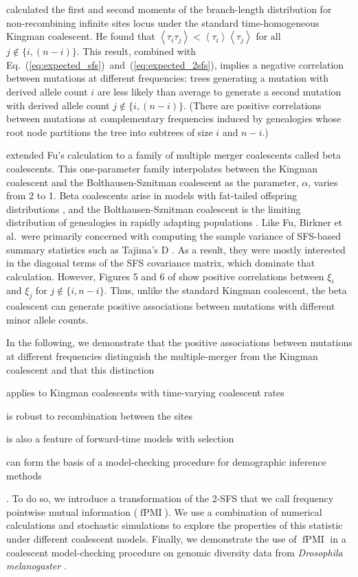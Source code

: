 \documentclass[11pt, letterpaper]{article}   	%
\newcommand{\eqs}[2]{Eq.~(\ref{#1})~and~(\ref{#2})}
\newcommand{\E}[1]{\left< #1 \right>}
\DeclareMathOperator{\fpmi}{fPMI}
\begin{document}
\cite{Fu1995} calculated the first and second moments of the branch-length distribution for non-recombining infinite sites locus under the standard time-homogeneous Kingman coalescent.
He found that $\E{\tau_i \tau_j} < \E{\tau_i}\E{\tau_j}$ for all $j \not\in \{i, (n-i)\}$.
This result, combined with \eqs{eq:expected_sfs}{eq:expected_2sfs}, implies a negative correlation between mutations at different frequencies: trees generating a mutation with derived allele count $i$ are less likely than average to generate a second mutation with derived allele count $j \not\in \{i, (n-i)\}$.
(There are positive correlations between mutations at complementary frequencies induced by genealogies whose root node partitions the tree into subtrees of size $i$ and $n-i$.)

\cite{BirknerEtAl2013} extended Fu's calculation to a family of multiple merger coalescents called beta coalescents.
This one-parameter family interpolates between the Kingman coalescent and the Bolthausen-Sznitman coalescent as the parameter, $\alpha$, varies from 2 to 1.
Beta coalescents arise in models with fat-tailed offspring distributions \autocite{Schweinsberg2003}, and the Bolthausen-Sznitman coalescent is the limiting distribution of genealogies in rapidly adapting populations \autocite{NeherHallatscheck2013}.
Like Fu, Birkner et al.\ were primarily concerned with computing the sample variance of SFS-based summary statistics such as Tajima's D \autocite{Tajima1989}.
As a result, they were mostly interested in the diagonal terms of the SFS covariance matrix, which dominate that calculation.
However, Figures 5 and 6 of \cite{BirknerEtAl2013} show positive correlations between $\xi_i$ and $\xi_j$ for $j \not\in \{i, n-i\}$.
Thus, unlike the standard Kingman coalescent, the beta coalescent can generate positive associations between mutations with different minor allele counts.

In the following, we demonstrate that the positive associations between mutations at different frequencies distinguish the multiple-merger from the Kingman coalescent and that this distinction
\begin{enumerate*}[label=(\roman*), before=\unskip{: }, itemjoin={{; }}, itemjoin*={{, and }}]
    \item applies to Kingman coalescents with time-varying coalescent rates
    \item is robust to recombination between the sites
    \item is also a feature of forward-time models with selection
    \item can form the basis of a model-checking procedure for demographic inference methods
\end{enumerate*}.
To do so, we introduce a transformation of the 2-SFS that we call frequency pointwise mutual information ($\fpmi$).
We use a combination of numerical calculations and stochastic simulations to explore the properties of this statistic under different coalescent models.
Finally, we demonstrate the use of $\fpmi$ in a coalescent model-checking procedure on genomic diversity data from \textit{Drosophila melanogaster} \autocite{LackEtAl2015}.
\end{document}
